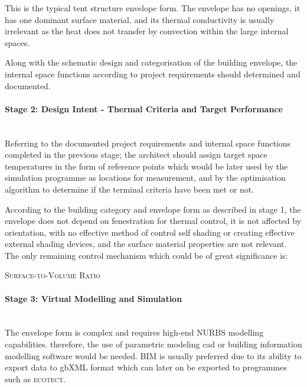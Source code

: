 This is the typical tent structure envelope form. The envelope has no openings, it has one dominant surface material, and its thermal conductivity is usually irrelevant as the heat does not transfer by convection within the large internal spaces.

Along with the schematic design and categorisation of the building envelope, the internal space functions according to project requirements should determined and documented.

\paragraph{Stage 2: Design Intent - Thermal Criteria and Target Performance}\mbox{}\\

Referring to the documented project requirements and internal space functions completed in the previous stage; the architect should assign target space temperatures in the form of reference points which would be later used by the simulation programme as locations for measurement, and by the optimisation algorithm to determine if the terminal criteria have been met or not.

According to the building category and envelope form as described in stage 1, the envelope does not depend on fenestration for thermal control, it is not affected by orientation, with no effective method of control self shading or creating effective external shading devices, and the surface material properties are not relevant. The only remaining control mechanism which could be of great significance is: 

\begin{compactenum}
	\item \textsc{Surface-to-Volume Ratio}
\end{compactenum}

\paragraph{Stage 3: Virtual Modelling and Simulation}\mbox{}\\

The envelope form is complex and requires high-end NURBS modelling capabilities. therefore, the use of parametric modeling cad or building information modelling software would be needed. BIM is usually preferred due to its ability to export data to gbXML format which can later on be exported to programmes such as \textsc{ecotect}.

